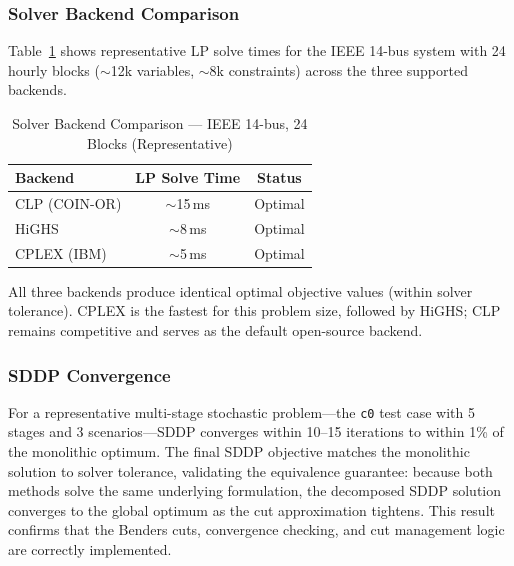 \subsubsection{Solver Backend Comparison}

Table~\ref{tab:solver_compare} shows representative LP solve times for
the IEEE 14-bus system with 24 hourly blocks ($\sim$12k variables,
$\sim$8k constraints) across the three supported backends.

\begin{table}[h]
  \centering
  \caption{Solver Backend Comparison --- IEEE 14-bus, 24 Blocks
    (Representative)}
  \label{tab:solver_compare}
  \begin{tabular}{@{}lcc@{}}
    \toprule
    Backend & LP Solve Time & Status \\
    \midrule
    CLP (COIN-OR)  & $\sim$15\,ms & Optimal \\
    HiGHS          & $\sim$8\,ms  & Optimal \\
    CPLEX (IBM)    & $\sim$5\,ms  & Optimal \\
    \bottomrule
  \end{tabular}
\end{table}

All three backends produce identical optimal objective values (within
solver tolerance).  CPLEX is the fastest for this problem size, followed
by HiGHS; CLP remains competitive and serves as the default open-source
backend.

\subsubsection{SDDP Convergence}

For a representative multi-stage stochastic problem---the \texttt{c0}
test case with 5 stages and 3 scenarios---SDDP converges within 10--15
iterations to within 1\% of the monolithic optimum.  The final SDDP
objective matches the monolithic solution to solver tolerance,
validating the equivalence guarantee: because both methods solve the
same underlying formulation, the decomposed SDDP solution converges to
the global optimum as the cut approximation tightens.  This result
confirms that the Benders cuts, convergence checking, and cut management
logic are correctly implemented.

